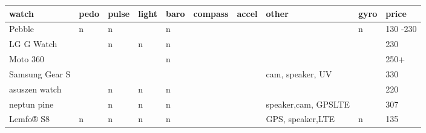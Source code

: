\begin{table}[h]
\begin{tabular}{|l|l|l|l|l|l|l|l|l|l|}
\hline
\textbf{watch}                            & \textbf{pedo}             & \textbf{pulse}            & \textbf{light}            & \textbf{baro}             & \textbf{compass}          & \textbf{accel}           & \textbf{other}      & \textbf{gyro}             & \textbf{price}              \\ \hline
Pebble                                    & \cellcolor[HTML]{FE0000}n & \cellcolor[HTML]{FE0000}n & \cellcolor[HTML]{32CB00}  & \cellcolor[HTML]{FE0000}n & \cellcolor[HTML]{32CB00}  & \cellcolor[HTML]{32CB00} &                     & \cellcolor[HTML]{FE0000}n & 130 -230                    \\ \hline
LG G Watch                                & \cellcolor[HTML]{32CB00}  & \cellcolor[HTML]{FE0000}n & \cellcolor[HTML]{FE0000}n & \cellcolor[HTML]{FE0000}n & \cellcolor[HTML]{32CB00}  & \cellcolor[HTML]{32CB00} &                     & \cellcolor[HTML]{32CB00}  & 230                         \\ \hline
Moto 360                                  & \cellcolor[HTML]{32CB00}  & \cellcolor[HTML]{32CB00}  & \cellcolor[HTML]{32CB00}  & \cellcolor[HTML]{FE0000}n & \cellcolor[HTML]{32CB00}  & \cellcolor[HTML]{32CB00} &                     & \cellcolor[HTML]{32CB00}  & 250+                        \\ \hline
\cellcolor[HTML]{F8FF00}Samsung Gear S    & \cellcolor[HTML]{32CB00}  & \cellcolor[HTML]{32CB00}  & \cellcolor[HTML]{32CB00}  & \cellcolor[HTML]{32CB00}  & \cellcolor[HTML]{32CB00}  & \cellcolor[HTML]{32CB00} & cam, speaker, UV    & \cellcolor[HTML]{32CB00}  & 330                         \\ \hline
asuszen watch                             & \cellcolor[HTML]{32CB00}  & \cellcolor[HTML]{FE0000}n & \cellcolor[HTML]{FE0000}n & \cellcolor[HTML]{FE0000}n & \cellcolor[HTML]{32CB00}  & \cellcolor[HTML]{32CB00} &                     & \cellcolor[HTML]{32CB00}  & 220                         \\ \hline
neptun pine                               & \cellcolor[HTML]{32CB00}  & \cellcolor[HTML]{FE0000}n & \cellcolor[HTML]{FE0000}n & \cellcolor[HTML]{FE0000}n & \cellcolor[HTML]{32CB00}  & \cellcolor[HTML]{32CB00} & speaker,cam, GPSLTE & \cellcolor[HTML]{32CB00}  & 307                         \\ \hline
Lemfo® S8                                 & \cellcolor[HTML]{FE0000}n & \cellcolor[HTML]{FE0000}n & \cellcolor[HTML]{FE0000}n & \cellcolor[HTML]{FE0000}n & \cellcolor[HTML]{32CB00}  & \cellcolor[HTML]{32CB00} & GPS, speaker,LTE    & \cellcolor[HTML]{FE0000}n & 135                         \\ \hline

\end{tabular}
\end{table}
